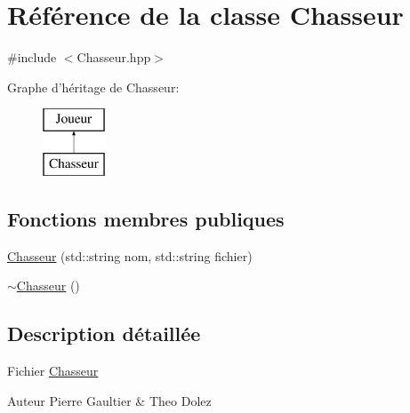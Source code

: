 \hypertarget{class_chasseur}{\section{Référence de la classe Chasseur}
\label{class_chasseur}
}


{\ttfamily \#include $<$Chasseur.\-hpp$>$}

Graphe d'héritage de Chasseur\-:\begin{figure}[H]
\begin{center}
\leavevmode
\includegraphics[height=2.000000cm]{class_chasseur}
\end{center}
\end{figure}
\subsection*{Fonctions membres publiques}
\begin{DoxyCompactItemize}
\item 
\hyperlink{class_chasseur_af4bca087f4380663c19cd91cf373cf50}{Chasseur} (std\-::string nom, std\-::string fichier)
\item 
\hyperlink{class_chasseur_a0a2966005d679a141a3da9beeba165fc}{$\sim$\-Chasseur} ()
\end{DoxyCompactItemize}


\subsection{Description détaillée}
Fichier \hyperlink{class_chasseur}{Chasseur} \begin{DoxyAuthor}{Auteur}
Pierre Gaultier \& Theo Dolez 
\end{DoxyAuthor}


